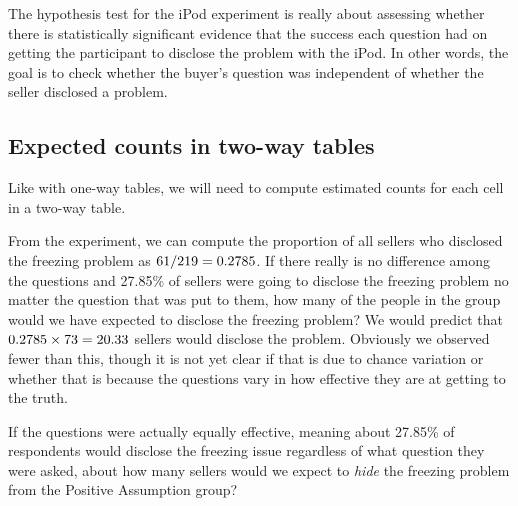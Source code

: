The hypothesis test for the iPod experiment is really about
assessing whether there is statistically significant evidence
that the success each question had on getting the participant
to disclose the problem with the iPod.
In other words, the goal is to check whether the buyer's
question was independent of whether the seller disclosed
a problem.


\D{\newpage}

\subsection{Expected counts in two-way tables}

\noindent%
Like with one-way tables, we will need to compute
estimated counts for each cell in a two-way table.

\begin{examplewrap}
\begin{nexample}{From the experiment,
    we can compute the proportion of all sellers who disclosed
    the freezing problem as $61{}/219 = 0.2785{}$.
    If there really is no difference among the questions
    and 27.85\% of sellers were going to disclose the freezing
    problem no matter the question that was put to them,
    how many of the \iPodDA{} people in the 
    group would we have expected to disclose the freezing
    problem?} \label{iPodExComputeExpAA}
  We would predict that $0.2785{} \times 73{} = 20.33{}$
  sellers would disclose the problem.
  Obviously we observed fewer than this, though it is not
  yet clear if that is due to chance variation or whether
  that is because the questions vary in how effective they
  are at getting to the truth.
\end{nexample}
\end{examplewrap}

\begin{exercisewrap}
\begin{nexercise}\label{iPodExComputeExpBB}
If the questions were actually equally effective,
meaning about 27.85\% of respondents would disclose the
freezing issue regardless of what question they were asked,
about how many sellers would we expect to \emph{hide} the
freezing problem from the Positive Assumption
group?\footnotemark
\end{nexercise}
\end{exercisewrap}

